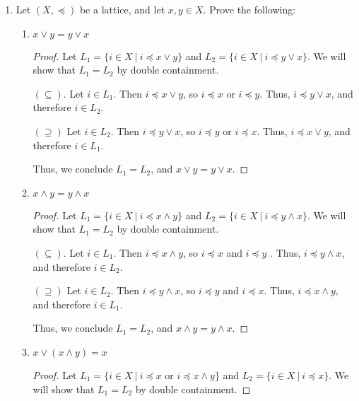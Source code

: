 \documentclass[12pt]{article}
\begin{document}
\begin{enumerate}
\begin{proof}
We can therefore conclude that $\displaystyle \bigvee_{i=1}^n A_i = \displaystyle\bigcup_{i=1}^n A_i$. The entire argument can be re-written with $\cap$ and $\wedge$, using the same logic above, so we have $\displaystyle \bigwedge_{i=1}^n A_i = \displaystyle\bigcap_{i=1}^n A_i$. 
\end{proof}

\item Let $(X, \preceq)$ be a lattice, and let $x, y\in X$. Prove the following:
\begin{enumerate}
\item $x\vee y = y \vee x$

\begin{proof}
Let $L_1 = \{i \in X\ |\ i \preceq x \vee y\}$ and $L_2 = \{i \in X\ |\ i \preceq y \vee x\}$. We will show that $L_1 = L_2$ by double containment. 

$(\subseteq)$. Let $i \in L_1$. Then $i \preceq x \vee y$, so $i \preceq x$ or $i \preceq y$. Thus, $i \preceq y \vee  x$, and therefore $i \in L_2$. 

$(\supseteq)$ Let $i \in L_2$. Then $i \preceq y \vee x$, so $i \preceq y$ or $i \preceq x$. Thus, $i \preceq x \vee y$, and therefore $i \in L_1$.

Thus, we conclude $L_1 = L_2$, and $x\vee y = y \vee x$. 
\end{proof}

\item $x\wedge y = y\wedge x$

\begin{proof}
Let $L_1 = \{i \in X\ |\ i \preceq x \wedge y\}$ and $L_2 = \{i \in X\ |\ i \preceq y \wedge x\}$. We will show that $L_1 = L_2$ by double containment. 

$(\subseteq)$. Let $i \in L_1$. Then $i \preceq x \wedge y$, so $i \preceq x$ and $i \preceq y$ . Thus, $i \preceq y \wedge  x$, and therefore $i \in L_2$. 

$(\supseteq)$ Let $i \in L_2$. Then $i \preceq y \wedge x$, so $i \preceq y$ and $i \preceq x$. Thus, $i \preceq x \wedge y$, and therefore $i \in L_1$.

Thus, we conclude $L_1 = L_2$, and $x\wedge y = y \wedge x$. 
\end{proof}
\item $x\vee (x\wedge y)=x$

\begin{proof}
Let $L_1 = \{i \in X\ |\ i \preceq x$ or $ i \preceq x \wedge y\}$ and $L_2 = \{i \in X\ |\ i \preceq x\}$. We will show that $L_1 = L_2$ by double containment. 


\end{proof}
\end{enumerate}
\end{enumerate}
\end{document}
